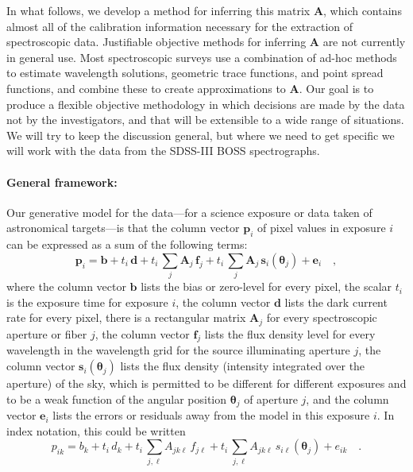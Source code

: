 \documentclass[12pt]{article}
\newcommand{\hmatrix}[1]{\boldsymbol{#1}}
\newcommand{\Amatrix}{\hmatrix{A}}
\newcommand{\pixels}{\hmatrix{p}}
\newcommand{\bias}{\hmatrix{b}}
\newcommand{\dark}{\hmatrix{d}}
\newcommand{\flux}{\hmatrix{f}}
\newcommand{\sky}{\hmatrix{s}}
\renewcommand{\angle}{\hmatrix{\theta}}
\newcommand{\error}{\hmatrix{e}}
\newcommand{\exptime}{t}
\begin{document}
In what follows, we develop a method for inferring this matrix
$\Amatrix$, which contains almost all of the calibration information
necessary for the extraction of spectroscopic data.  Justifiable
objective methods for inferring $\Amatrix$ are not currently in
general use.  Most spectroscopic surveys use a combination of ad-hoc
methods to estimate wavelength solutions, geometric trace functions,
and point spread functions, and combine these to create approximations
to $\Amatrix$.  Our goal is to produce a flexible objective
methodology in which decisions are made by the data not by the
investigators, and that will be extensible to a wide range of
situations.  We will try to keep the discussion general, but where we
need to get specific we will work with the data from the SDSS-III BOSS
spectrographs.

\paragraph{General framework:}
Our generative model for the data---for a science exposure or data
taken of astronomical targets---is that the column vector $\pixels_i$
of pixel values in exposure $i$ can be expressed as a sum of the
following terms:
\begin{equation}
\pixels_i = \bias + \exptime_i\,\dark
          + \exptime_i\,\sum_j \Amatrix_j\,\flux_j
          + \exptime_i\,\sum_j \Amatrix_j\,\sky_i(\angle_j)
          + \error_i \quad ,
\end{equation}
where the column vector $\bias$ lists the bias or zero-level for every
pixel, the scalar $\exptime_i$ is the exposure time for exposure $i$,
the column vector $\dark$ lists the dark current rate for every pixel,
there is a rectangular matrix $\Amatrix_j$ for every spectroscopic
aperture or fiber $j$, the column vector $\flux_j$ lists the flux
density level for every wavelength in the wavelength grid for the
source illuminating aperture $j$, the column vector $\sky_i(\angle_j)$
lists the flux density (intensity integrated over the aperture) of the
sky, which is permitted to be different for different exposures and to
be a weak function of the angular position $\angle_j$ of aperture $j$,
and the column vector $\error_i$ lists the errors or residuals away
from the model in this exposure $i$.  In index notation, this could be
written
\begin{equation}
p_{ik} = b_k + \exptime_i\,d_k
       + \exptime_i\,\sum_{j,\ell} A_{jk\ell}\,f_{j\ell}
       + \exptime_i\,\sum_{j,\ell} A_{jk\ell}\,s_{i\ell}(\angle_j)
       + e_{ik} \quad .
\end{equation}
\end{document}
